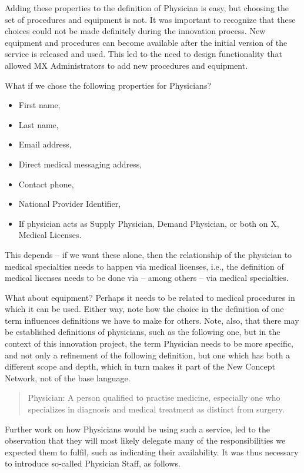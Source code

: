 \documentclass[graybox,envcountchap,sectrefs]{svmono}
\newcommand{\ncnf}{New Concept Network}
\newcommand{\nterm}[1]{\textsf{#1}}
\begin{document}
Adding these properties to the definition of \nterm{Physician} is easy, but choosing the set of procedures and equipment is not. It was important to recognize that these choices could not be made definitely during the innovation process. New equipment and procedures can become available after the initial version of the service is released and used. This led to the need to design functionality that allowed \nterm{MX Administrators} to add new procedures and equipment.

What if we chose the following properties for Physicians?
\begin{itemize}
	\item First name,
	\item Last name,
	\item Email address,
	\item Direct medical messaging address,
	\item Contact phone,
	\item National Provider Identifier,
	\item If physician acts as Supply Physician, Demand Physician, or both on X,
Medical Licenses.
\end{itemize}

This depends -- if we want these alone, then the relationship of the physician to medical specialties needs to happen via medical licenses, i.e., the definition of medical licenses needs to be done via -- among others -- via medical specialties. 

What about equipment? Perhaps it needs to be related to medical procedures in which it can be used. Either way, note how the choice in the definition of one term influences definitions we have to make for others. Note, also, that there may be established definitions of physicians, such as the following one, but in the context of this innovation project, the term Physician needs to be more specific, and not only a refinement of the following definition, but one which has both a different scope and depth, which in turn makes it part of the \ncnf, not of the base language.

\begin{quote}
Physician: A person qualified to practise medicine, especially one who specializes in diagnosis and medical treatment as distinct from surgery. \cite{def-physician}
\end{quote}

Further work on how \nterm{Physicians} would be using such a service, led to the observation that they will most likely delegate many of the responsibilities we expected them to fulfil, such as indicating their availability. It was thus necessary to introduce so-called \nterm{Physician Staff}, as follows.
\end{document}
